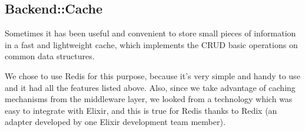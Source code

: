 \subsection{Backend::Cache}
Sometimes it has been useful and convenient to store small pieces of
information in a fast and lightweight cache, which implements the CRUD basic
operations on common data structures.

We chose to use Redis for this purpose, because it's very simple and handy to
use and it had all the features listed above.
Also, since we take advantage of caching mechanisms from the middleware layer,
we looked from a technology which was easy to integrate with Elixir, and this
is true for Redis thanks to Redix (an adapter developed by one Elixir
development team member).

